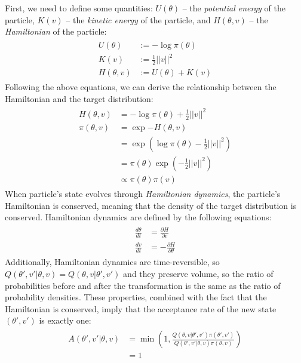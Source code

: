 \documentclass[12pt]{article}
\begin{document}
First, we need to define some quantities: $U(\theta)$ -- the \textit{potential energy} of the particle, $K(v)$ -- the \textit{kinetic energy} of the particle, and $H(\theta, v)$ -- the \textit{Hamiltonian} of the particle:
\begin{align}
\begin{split}
U(\theta) &:= -\log \pi(\theta) \\
K(v) &:= \frac{1}{2} ||v||^2 \\
H(\theta, v) &:= U(\theta) + K(v)
\end{split}
\label{eq_hamiltonian}
\end{align}
Following the above equations, we can derive the relationship between the Hamiltonian and the target distribution:
\begin{align}
\begin{split}
H(\theta, v) &= -\log \pi(\theta) + \frac{1}{2}||v||^2 \\
\pi(\theta, v) &= \exp {-H(\theta, v)} \\
&= \exp \left(\log \pi(\theta) - \frac{1}{2}||v||^2 \right) \\
&= \pi(\theta) \exp \left( -\frac{1}{2}||v||^2 \right) \\
&\propto \pi(\theta) \pi(v)
\end{split}
\end{align}
When particle's state evolves through \textit{Hamiltonian dynamics}, the particle's Hamiltonian is conserved, meaning that the density of the target distribution is conserved. Hamiltonian dynamics are defined by the following equations:
\begin{align}
\begin{split}
\frac{d\theta}{dt} &= \frac{\partial H}{\partial v} \\
\frac{dv}{dt} &= -\frac{\partial H}{\partial \theta}
\end{split}
\label{eq_ham_dynamics}
\end{align}
Additionally, Hamiltonian dynamics are time-reversible, so $Q(\theta',v'|\theta,v) = Q(\theta,v|\theta',v')$ and they preserve volume, so the ratio of probabilities before and after the transformation is the same as the ratio of probability densities. These properties, combined with the fact that the Hamiltonian is conserved, imply that the acceptance rate of the new state $(\theta', v')$ is exactly one:
\begin{align}
\begin{split}
A(\theta',v'|\theta,v) &= \min \left(1, \frac{Q(\theta,v|\theta',v')\pi(\theta',v')}{Q(\theta',v'|\theta,v)\pi(\theta,v)} \right) \\
&= 1
\end{split}
\end{align}
\end{document}
